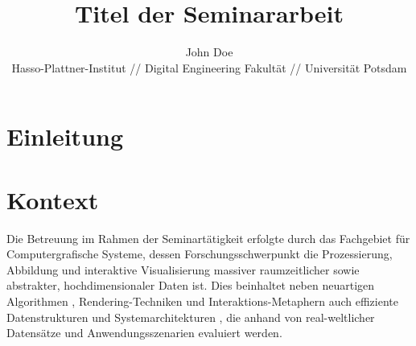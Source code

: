 \documentclass[german]{cgspaper} %
\title{Titel der Seminararbeit}
\author{John Doe\\ Hasso-Plattner-Institut // Digital Engineering Fakult{\"a}t // Universität Potsdam}
\begin{document}

\maketitle

\begin{abstract}
\end{abstract}

\copyrightspace %

\section{Einleitung}


\section{Kontext}
\label{sec:Kontext}
Die Betreuung im Rahmen der Seminartätigkeit erfolgte durch das Fachgebiet für Computergrafische Systeme, dessen Forschungsschwerpunkt die Prozessierung, Abbildung und interaktive Visualisierung massiver raumzeitlicher \cite{Oehlke2015,Buschmann2015,Buschmann2014,Maass2006} sowie abstrakter, hochdimensionaler Daten \cite{Limberger2017,Limberger2016,Wuerfel2015} ist. Dies beinhaltet neben neuartigen Algorithmen \cite{RichterKyprianidis2013,RichterBehrens2013,Glander2012}, Rendering-Techniken \cite{Semmo2016,Pasewaldt2014,Maass2006a,Doellner2005} und Interaktions-Metaphern \cite{Semmo2016a,Scheibel2016,Semmo2014} auch effiziente Datenstrukturen \cite{Scheibel2017,Richter2015} und Systemarchitekturen \cite{Klimke2014,Trapp2012,Klimke2010}, die anhand von real-weltlicher Datensätze und Anwendungsszenarien  \cite{Discher2016,Trapp2015,Engel2012} evaluiert werden. 
\end{document}
